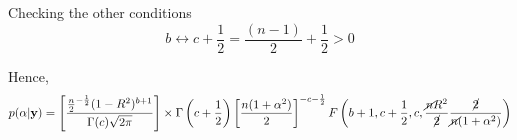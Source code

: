 \documentclass{amsart}[12pt]
\theoremstyle{definition}
\begin{document}
Checking the other conditions
\[
	b \leftrightarrow c + \frac{1}{2} = \frac{(n - 1)}{2} + \frac{1}{2} > 0
\]

Hence,
\[
	p(\alpha | {\bf y}) = \left[ \frac{\frac{n}{2}^{-\frac{1}{2}} (1 - R^2)^{b + 1}}{\Gamma(c) \sqrt{2 \pi}} \right] \times \Gamma\left(c + \frac{1}{2}\right) \left[ \frac{n(1 + \alpha^2)}{2} \right]^{-c-\frac{1}{2}} F\left(b + 1, c + \frac{1}{2}, c, \frac{\cancel{n} R^2}{\cancel{2}} \frac{\cancel{2}}{\cancel{n} (1 + \alpha^2)}\right)
\]




\end{document}
